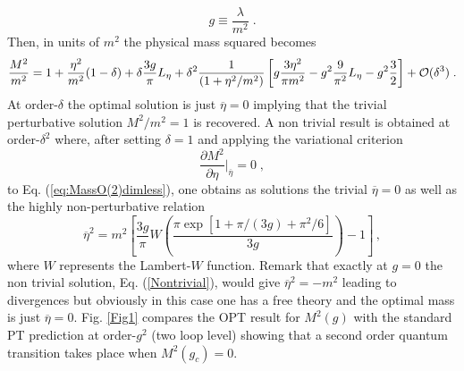 \documentclass[a4paper,11pt]{article}
\def\be{\begin{equation}}
\def\ee{\end{equation}}
\def\leta{L_\eta}
\begin{document}
\be
g\equiv \frac{\lambda}{m^2} \;.
\ee
Then, in units of $m^2$ the physical mass squared becomes
\be\label{eq:MassO(2)dimless}
\frac{M^2}{m^2}= 1   + \frac{\eta^2}{m^2} (1- \delta) + \delta \frac{3g}{\pi}\leta +  \delta^2 \frac{1}{(1+\eta^2/m^2)} \left [g\frac{3 \eta^2}{\pi m^2} - g^2 \frac{9}{\pi^2} \leta - g^2 \frac{3}{2}   \right ]  + {\cal O}(\delta^3)\;.
\ee
At order-$\delta$  the optimal solution is just ${\overline \eta}=0$ implying that the trivial perturbative solution $M^2/m^2 =1$ is recovered. A non trivial result is obtained at order-$\delta^2$ where, after setting $\delta=1$ and applying the variational criterion \cite{pms1,pms2} 
\begin{equation}
\frac{\partial M^2}{\partial \eta} \Bigr |_{\overline \eta} = 0 \;,
\label{pms}
\end{equation}
to Eq. (\ref {eq:MassO(2)dimless}), one obtains as  solutions the trivial $\overline \eta =0$ as well as  the highly non-perturbative relation
\begin{equation}
{\overline \eta}^2 = m^2 \left [ \frac{3 g}{\pi} W\left ( \frac{\pi \exp[1 + \pi/{(3 g)} + \pi^2/6]} {3g }  \right ) - 1 \right ]\,,
\label {Nontrivial}
\end{equation}
where $W$ represents the Lambert-$W$ function.  Remark that exactly at $g=0$ the non trivial solution, Eq. (\ref {Nontrivial}), would  give ${\overline \eta}^2 = - m^2$ leading to divergences but obviously in this case one has a free theory and the optimal mass is just ${\overline \eta} =0$. Fig. \ref {Fig1} compares the OPT result for  $M^2(g)$ with the standard PT prediction at order-$g^2$ (two loop level) showing that a second order quantum transition takes place when $M^2(g_c)=0$. 
\end{document}
